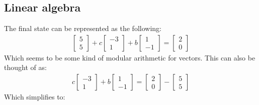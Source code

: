 \documentclass[letterpaper, 12pt]{article}
\begin{document}
\subsection{Linear algebra}
The final state can be represented as the following:
\begin{align*}
\begin{bmatrix}
    5\\
    5
\end{bmatrix}
+ c
\begin{bmatrix}
    -3\\
    1
\end{bmatrix}
+ b
\begin{bmatrix}
    1\\
    -1
\end{bmatrix}
 =
\begin{bmatrix}
    2\\
    0
\end{bmatrix}
\end{align*}
Which seems to be some kind of modular arithmetic for vectors.
This can also be thought of as:
\begin{align*}
c
\begin{bmatrix}
    -3\\
    1
\end{bmatrix}
+ b
\begin{bmatrix}
    1\\
    -1
\end{bmatrix}
=
\begin{bmatrix}
    2\\
    0
\end{bmatrix}
 -
\begin{bmatrix}
    5\\
    5
\end{bmatrix}
\end{align*}
Which simplifies to:
\end{document}
